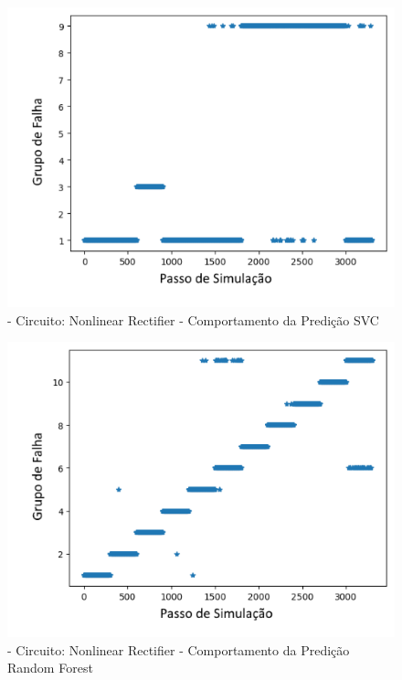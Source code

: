        
        \begin{figure}[H]
        \begin{center}
        \includegraphics[width=13cm]{./01_Pre_textuais/nonlin_figs/SVC_Nonlinear_Rectfier_+_4bit_PRBS_[FALHA]_-_300_-_02sraw.png}
        \caption{\label{fig:DecisionTreeClassifieSalenkey}- Circuito: Nonlinear Rectifier - Comportamento da Predição SVC}
        \end{center}
        \end{figure}
        
        \begin{figure}[H]
        \begin{center}
        \includegraphics[width=13cm]{./01_Pre_textuais/nonlin_figs/RandomForestClassifier_Nonlinear_Rectfier_+_4bit_PRBS_[FALHA]_-_300_-_02sraw.png}
        \caption{\label{fig:DecisionTreeClassifieSalenkey}- Circuito: Nonlinear Rectifier - Comportamento da Predição Random Forest }
        \end{center}
        \end{figure}
        
